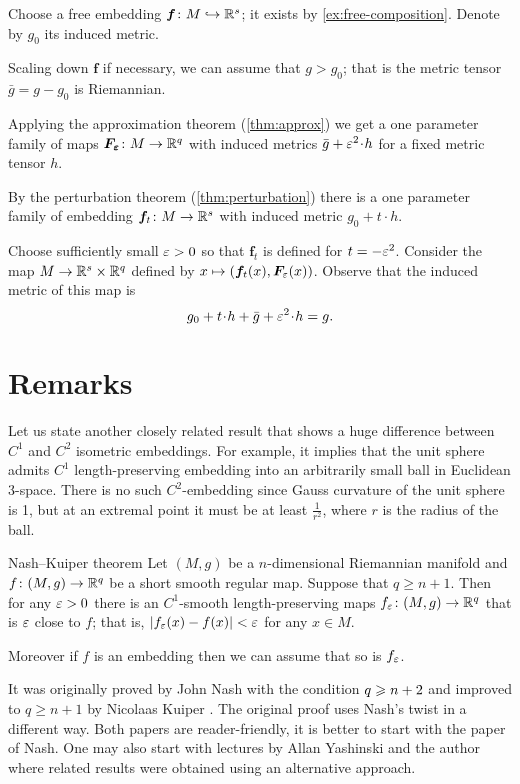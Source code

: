 Choose a free embedding $\bm{f}\colon M\hookrightarrow\mathbb{R}^s$;
it exists by \ref{ex:free-composition}.
Denote by $g_0$ its induced metric.

Scaling down $\bm{f}$ if necessary, we can assume that $g>g_0$;
that is the metric tensor $\bar g= g-g_0$ is Riemannian.

Applying the approximation theorem (\ref{thm:approx}) we get a one parameter family of maps $\bm{F_\varepsilon}\colon M\to \mathbb{R}^q$ with induced metrics $\bar g+\eps^2\cdot h$ for a fixed metric tensor $h$.

By the perturbation theorem (\ref{thm:perturbation}) there is a one parameter family of embedding $\bm{f}_t\colon M\to \mathbb{R}^s$ with induced metric $g_0+t\cdot h$.

Choose sufficiently small $\varepsilon>0$ so that $\bm{f}_t$ is defined for $t=-\varepsilon^2$.
Consider the map $M\to \mathbb{R}^s\times\mathbb{R}^q$ defined by 
$x\mapsto (\bm{f}_t(x),\bm{F}_\varepsilon(x))$.
Observe that the induced metric of this map is
\[g_0+t\cdot h+\bar g+\eps^2\cdot h=g.\]
\qedsf

\section{Remarks}

Let us state another closely related result that shows a huge difference between $C^1$ and $C^2$ isometric embeddings.
For example, it implies that the unit sphere admits $C^1$ length-preserving embedding into an arbitrarily small ball in Euclidean 3-space.
There is no such $C^2$-embedding since Gauss curvature of the unit sphere is 1, but at an extremal point it must be at least $\tfrac1{r^2}$, where $r$ is the radius of the ball.

\begin{thm}{Nash--Kuiper theorem}
Let $(M,g)$ be a $n$-dimensional Riemannian manifold and $f\colon(M,g)\to \mathbb{R}^q$ be a short smooth regular map.
Suppose that $q\ge n+1$.
Then for any $\varepsilon>0$ there is an $C^1$-smooth length-preserving maps $f_\varepsilon\colon(M,g)\to \mathbb{R}^q$ that is $\varepsilon$ close to $f$;
that is, $|f_\varepsilon(x)-f(x)|<\varepsilon$ for any $x\in M$.

Moreover if $f$ is an embedding then we can assume that so is $f_\varepsilon$.

\end{thm}


It was originally proved by John Nash \cite{nash-1954} with the condition $q\z\ge n+2$ and improved to $q\ge n+1$ by Nicolaas Kuiper \cite{kuiper-1955}.
The original proof uses Nash's twist in a different way. Both papers are reader-friendly, it is better to start with the paper of Nash.
One may also start with lectures by Allan Yashinski and the author \cite{petrunin-yashinski} where related results were obtained using an alternative approach.

